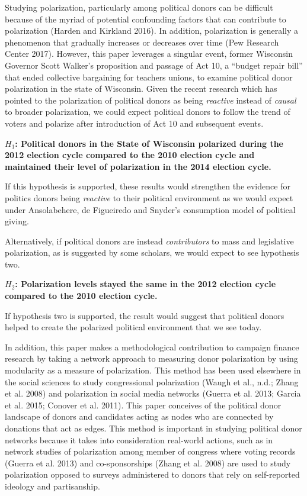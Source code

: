 \documentclass[12pt,]{article}
\begin{document}
Studying polarization, particularly among political donors can be
difficult because of the myriad of potential confounding factors that
can contribute to polarization (Harden and Kirkland 2016). In addition,
polarization is generally a phenomenon that gradually increases or
decreases over time (Pew Research Center 2017). However, this paper
leverages a singular event, former Wisconsin Governor Scott Walker's
proposition and passage of Act 10, a ``budget repair bill'' that ended
collective bargaining for teachers unions, to examine political donor
polarization in the state of Wisconsin. Given the recent research which
has pointed to the polarization of political donors as being
\emph{reactive} instead of \emph{causal} to broader polarization, we
could expect political donors to follow the trend of voters and polarize
after introduction of Act 10 and subsequent events.

\textbf{\(H_{1}\): Political donors in the State of Wisconsin polarized
during the 2012 election cycle compared to the 2010 election cycle and
maintained their level of polarization in the 2014 election cycle.}

If this hypothesis is supported, these results would strengthen the
evidence for politics donors being \emph{reactive} to their political
environment as we would expect under Ansolabehere, de Figueiredo and
Snyder's consumption model of political giving.

Alternatively, if political donors are instead \emph{contributors} to
mass and legislative polarization, as is suggested by some scholars, we
would expect to see hypothesis two.

\textbf{\(H_{2}\): Polarization levels stayed the same in the 2012
election cycle compared to the 2010 election cycle.}

If hypothesis two is supported, the result would suggest that political
donors helped to create the polarized political environment that we see
today.

In addition, this paper makes a methodological contribution to campaign
finance research by taking a network approach to measuring donor
polarization by using modularity as a measure of polarization. This
method has been used elsewhere in the social sciences to study
congressional polarization (Waugh et al., n.d.; Zhang et al. 2008) and
polarization in social media networks (Guerra et al. 2013; Garcia et al.
2015; Conover et al. 2011). This paper conceives of the political donor
landscape of donors and candidates acting as nodes who are connected by
donations that act as edges. This method is important in studying
political donor networks because it takes into consideration real-world
actions, such as in network studies of polarization among member of
congress where voting records (Guerra et al. 2013) and co-sponsorships
(Zhang et al. 2008) are used to study polarization opposed to surveys
administered to donors that rely on self-reported ideology and
partisanship.
\end{document}
